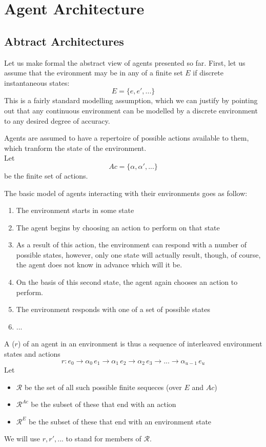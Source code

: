 

\chapter{Agent Architecture}
\minitoc

\section{Abtract Architectures}
Let us make formal the abstract view of agents presented so far. First, let us assume that the evironment may be in any of a finite set $E$ if discrete instantaneous states:
\[E = \{e, e',...\}\]
This is a fairly standard modelling assumption, which we can justify by pointing out that any continuous environment can be modelled by a discrete environment to any desired degree of accuracy.

Agents are assumed to have a repertoire of possible actions available to them, which tranform the state of the environment. \\
Let
\[Ac = \{\alpha, \alpha',...\}\]
be the finite set of actions.

The basic model of agents interacting with their environments goes as follow:
\begin{enumerate}
\item The environment starts in some state
\item The agent begins by choosing an action to perform on that state
\item As a result of this action, the environment can respond with a number of possible states, however, only one state will actually result, though, of course, the agent does not know in advance which will it be.
\item On the basis of this second state, the agent again chooses an action to perform.
\item The environment responds with one of a set of possible states
\item ...
\end{enumerate}

A  ($r$) of an agent in an environment is thus a sequence of interleaved environment states and actions
\[r: e_0 \rightarrow \alpha_0\,e_1\rightarrow \alpha_1\,e_2\rightarrow \alpha_2\,e_3\rightarrow ... \rightarrow \alpha_{u-1}\,e_u\]
Let 
\begin{itemize}
\item $\mathcal{R}$ be the set of all such possible finite sequeces (over $E$ and $Ac$)
\item $\mathcal{R}^{Ac}$ be the subset of these that end with an action
\item $\mathcal{R}^{E}$ be the subset of these that end with an environment state 
\end{itemize}
We will use $r, r', ...$ to stand for members of $\mathcal{R}$.

